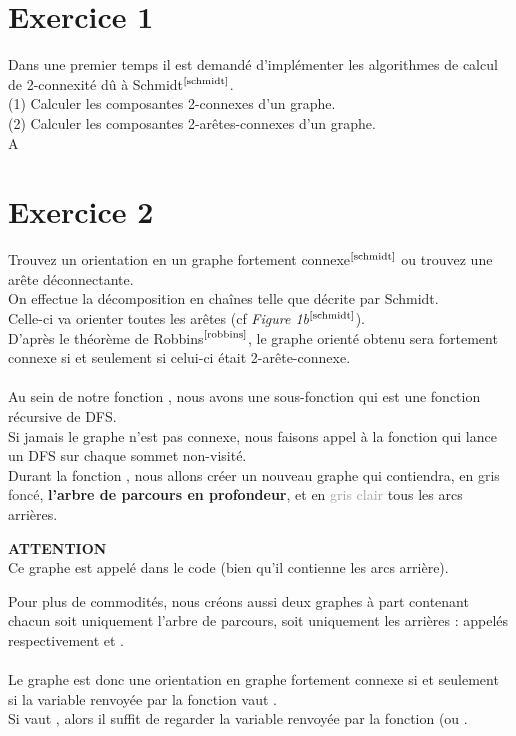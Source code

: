 \documentclass{article}      %
\begin{document}
\section{Exercice 1}
\textcolor{exogris}{
Dans une premier temps il est demandé d’implémenter les algorithmes de calcul de 2-connexité dû à Schmidt$^\text{\cite{schmidt}}$.
\\(1) Calculer les composantes 2-connexes d’un graphe.
\\(2) Calculer les composantes 2-arêtes-connexes d’un graphe.
}
\\A



\section{Exercice 2}
\textcolor{exogris}{
Trouvez un orientation en un graphe fortement connexe$^\text{\cite{schmidt}}$ ou trouvez une arête déconnectante.
}
\\On effectue la décomposition en chaînes telle que décrite par Schmidt.
\\Celle-ci va orienter toutes les arêtes (cf \textit{Figure 1b}$^\text{\cite{schmidt}}$).
\\D'après le théorème de Robbins$^\text{\cite{robbins}}$, le graphe orienté obtenu sera fortement connexe si et seulement si celui-ci était 2-arête-connexe.
\\\\Au sein de notre fonction , nous avons une sous-fonction  qui est une fonction récursive de DFS.
\\Si jamais le graphe n'est pas connexe, nous faisons appel à la fonction  qui lance un DFS sur chaque sommet non-visité.
\\Durant la fonction , nous allons créer un nouveau graphe qui contiendra, en \textcolor[HTML]{333333}{gris foncé}, \textbf{l'arbre de parcours en profondeur}, et en \textcolor[HTML]{a0a0a0}{gris clair} tous les arcs arrières.
\begin{danger}
{ \scriptsize \textcolor{danger}{ \textbf{ATTENTION}}}
\vspace{3px}
\\ Ce graphe est appelé  dans le code (bien qu'il contienne les arcs arrière).
\end{danger}
Pour plus de commodités, nous créons aussi deux graphes à part contenant chacun soit uniquement l'arbre de parcours, soit uniquement les arrières : appelés respectivement  et .
\\\\Le graphe  est donc une orientation en graphe fortement connexe si et seulement si la variable  renvoyée par la fonction vaut .
\\Si {} vaut , alors il suffit de regarder la variable  renvoyée par la fonction (ou .
\end{document}

